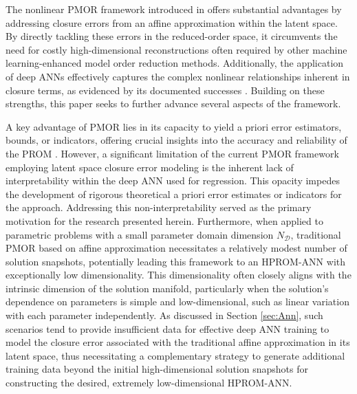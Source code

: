 \documentclass[preprint,10pt]{elsarticle}
\begin{document}
The nonlinear PMOR framework introduced in \cite{barnett2023neural} offers substantial advantages by addressing closure errors from an affine approximation within the latent space. 
By directly tackling these errors in the reduced-order space, it circumvents the need for costly high-dimensional reconstructions often required by other machine learning-enhanced
model order reduction methods. Additionally, the application of deep ANNs effectively captures the complex nonlinear relationships inherent in closure terms, as evidenced by its 
documented successes \cite{barnett2023neural, cohen2023nonlinear}. Building on these strengths, this paper seeks to further advance several aspects of the framework.

A key advantage of PMOR lies in its capacity to yield a priori error estimators, bounds, or indicators, offering crucial insights into the accuracy and reliability of the PROM 
\cite{homescu2005error, singler2014new}. However, a significant limitation of the current PMOR framework employing latent space closure error modeling is the inherent lack of 
interpretability within the deep ANN used for regression. This opacity impedes the development of rigorous theoretical a priori error estimates or indicators for the approach. 
Addressing this non-interpretability served as the primary motivation for the research presented herein. Furthermore, when applied to parametric problems with a small parameter 
domain dimension $N_\mathcal{D}$, traditional PMOR based on affine approximation necessitates a relatively modest number of solution snapshots, potentially leading this framework 
to an HPROM-ANN with exceptionally low dimensionality. This dimensionality often closely aligns with the intrinsic dimension of the solution manifold, particularly when the 
solution's dependence on parameters is simple and low-dimensional, such as linear variation with each parameter independently. As discussed in Section \ref{sec:Ann}, such scenarios 
tend to provide insufficient data for effective deep ANN training to model the closure error associated with the traditional affine approximation in its latent space, thus 
necessitating a complementary strategy to generate additional training data beyond the initial high-dimensional solution snapshots for constructing the desired, extremely 
low-dimensional HPROM-ANN.
\end{document}
